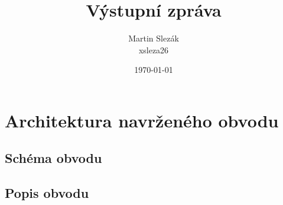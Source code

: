 \documentclass{article}
\title{Výstupní zpráva}
\author{Martin Slezák \\ xsleza26}
\date{\today}
\begin{document}
\maketitle

	\section{Architektura navrženého obvodu}
	\subsection{Schéma obvodu}

	\subsection{Popis obvodu}
\end{document}
